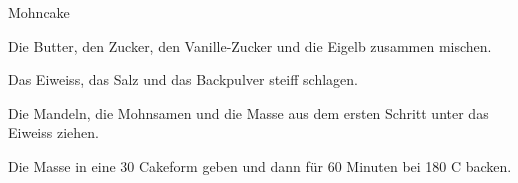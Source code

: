 
\begin{recipe}[]{Mohncake}{}{}



\step
Die Butter, den Zucker, den Vanille-Zucker und die Eigelb zusammen mischen.

\step
Das Eiweiss, das Salz und das Backpulver steiff schlagen.

\step
Die Mandeln, die Mohnsamen und die Masse aus dem ersten Schritt unter das Eiweiss ziehen.

\step
Die Masse in eine 30 \cm Cakeform geben und dann f\"ur 60 Minuten bei 180 C backen.

\end{recipe}